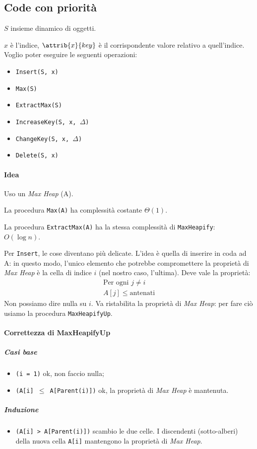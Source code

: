 \subsection{Code con priorità} \label{codeconpriorita}
$S$ insieme dinamico di oggetti. \par
$x$ è l'indice, $\attrib{x}{key}$ è il corrispondente valore relativo a quell'indice.
Voglio poter eseguire le seguenti operazioni:
\begin{itemize}[noitemsep]
	\item \texttt{Insert(S, x)}
	\item \texttt{Max(S)}
	\item \texttt{ExtractMax(S)}
	\item \texttt{IncreaseKey(S, x, $\Delta$)}
	\item \texttt{ChangeKey(S, x, $\Delta$)}
	\item \texttt{Delete(S, x)}
\end{itemize}
\paragraph{Idea} Uso un \emph{Max Heap} (A).


La procedura \texttt{Max(A)} ha complessità costante $\Theta (1)$.


La procedura \texttt{ExtractMax(A)} ha la stessa complessità di \texttt{MaxHeapify}: \\
$O(\log n)$.
\bigskip

Per \texttt{Insert}, le cose diventano più delicate. L'idea è quella di inserire
in coda ad A: in questo modo, l'unico elemento che potrebbe compromettere la proprietà di 
\emph{Max Heap} è la cella di indice $i$ (nel nostro caso, l'ultima). Deve vale la proprietà:
\begin{gather*}
	\text{Per ogni } j \neq i \\
	A[j] \leq \text{antenati}
\end{gather*}
Non possiamo dire nulla su $i$. Va ristabilita la proprietà di \emph{Max Heap}: per fare ciò 
usiamo la procedura \texttt{MaxHeapifyUp}.


\paragraph{Correttezza di MaxHeapifyUp}
\subparagraph{Casi base} 
\begin{itemize}
	\item[] \texttt{(i = 1)} ok, non faccio nulla;
	\item[] \texttt{(A[i] $\leq$ A[Parent(i)])} ok, la proprietà di \emph{Max Heap} è mantenuta.
\end{itemize}
\subparagraph{Induzione}
\begin{itemize}
	\item[] \texttt{(A[i] > A[Parent(i)])} scambio le due celle. I discendenti (sotto-alberi) della nuova
	cella \texttt{A[i]} mantengono la proprietà di \emph{Max Heap}.
\end{itemize}

